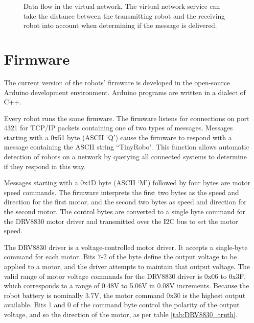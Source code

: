  \begin{figure}
 	\centering
	\caption{Data flow in the virtual network. The virtual network service can take the distance between the transmitting robot and the receiving robot into account when determining if the message is delivered.}
 \end{figure}

\section {Firmware}

The current version of the robots' firmware is developed in the open-source Arduino development environment.
Arduino programs are written in a dialect of C++. 

Every robot runs the same firmware. 
The firmware listens for connections on port 4321 for TCP/IP packets containing one of two types of messages. 
Messages starting with a 0x51 byte (ASCII `Q') cause the firmware to respond with a message containing the ASCII string ``TinyRobo". 
This function allows automatic detection of robots on a network by querying all connected systems to determine if they respond in this way. 

Messages starting with a 0x4D byte (ASCII `M') followed by four bytes are motor speed commands.
The firmware interprets the first two bytes as the speed and direction for the first motor, and the second two bytes as speed and direction for the second motor.
The control bytes are converted to a single byte command for the DRV8830 motor driver and transmitted over the I2C bus to set the motor speed.
 
The DRV8830 driver is a voltage-controlled motor driver. 
It accepts a single-byte command for each motor. 
Bits 7-2 of the byte define the output voltage to be applied to a motor, and the driver attempts to maintain that output voltage.
The valid range of motor voltage commands for the DRV8830 driver is 0x06 to 0x3F, which corresponds to a range of 0.48V to 5.06V in 0.08V increments. 
Because the robot battery is nominally 3.7V, the motor command 0x30 is the highest output available. 
Bits 1 and 0 of the command byte control the polarity of the output voltage, and so the direction of the motor, as per table \ref{tab:DRV8830_truth}.

